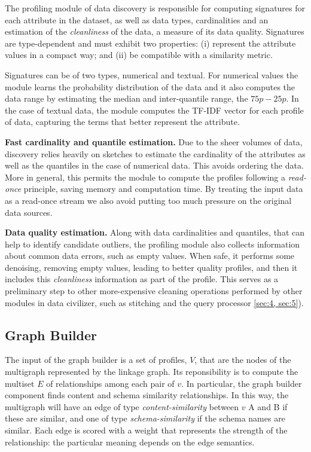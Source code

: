 The profiling module of data discovery is responsible for computing signatures
for each attribute in the dataset, as well as data types, cardinalities and an
estimation of the \emph{cleanliness} of the data, \ie a measure of its data
quality. Signatures are type-dependent and must exhibit two properties: (i)
represent the attribute values in a compact way; and (ii) be compatible with a
similarity metric. 

Signatures can be of two types, numerical and textual. For numerical values the
module learns the probability distribution of the data and it also computes the
data range by estimating the median and inter-quantile range, \ie the $75p -
25p$. In the case of textual data, the module computes the TF-IDF vector for
each profile of data, capturing the terms that better represent the attribute.

\textbf{Fast cardinality and quantile estimation.} Due to the sheer volumes of
data, discovery relies heavily on sketches to estimate the cardinality of the
attributes as well as the quantiles in the case of numerical data. This avoids
ordering the data. More in general, this permits the module to compute the
profiles following a \emph{read-once} principle, saving memory and computation
time. By treating the input data as a read-once stream we also avoid putting too
much pressure on the original data sources.

\textbf{Data quality estimation.} Along with data cardinalities and quantiles,
that can help to identify candidate outliers, the profiling module also collects
information about common data errors, such as empty values. When safe, it
performs some denoising, \ie removing empty values, leading to better quality profiles, and then it
includes this \emph{cleanliness} information as part of the profile. This serves
as a preliminary step to other more-expensive cleaning operations performed by
other modules in data civilizer, such as stitching and the query processor \ref{sec:4,
sec:5}). 

\subsection{Graph Builder} The input of the graph builder is a set of profiles,
$V$, that are the nodes of the multigraph represented by the linkage graph. Its
reponsibility is to compute the multiset $E$ of relationships among each pair of
$v$. In particular, the graph builder component finds content and schema
similarity relationships. In this way, the multigraph will have an edge of type
\emph{content-similarity} between $v$ A and B if these are similar, and one of
type \emph{schema-similarity} if the schema names are similar. Each edge is
scored with a weight that represents the strength of the relationship: the
particular meaning depends on the edge semantics.

